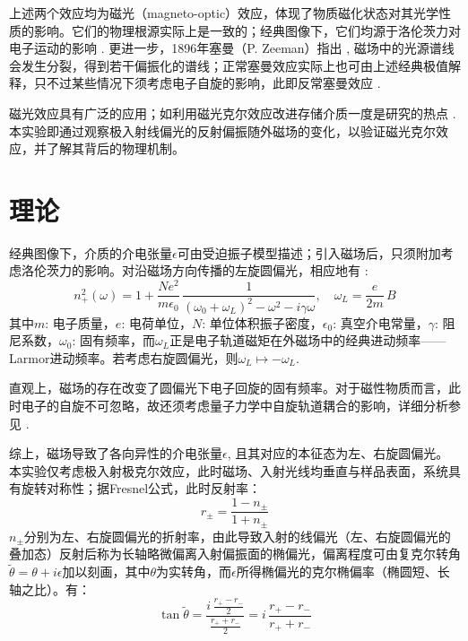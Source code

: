 \documentclass[aps,pre,12pt,preprint,%
	onecolumn,showpacs,showkeys,nofootinbib]{revtex4-1}
\begin{document}
	上述两个效应均为磁光（magneto-optic）效应，体现了物质磁化状态对其光学性质的影响。它们的物理根源实际上是一致的；经典图像下，它们均源于洛伦茨力对电子运动的影响 \cite{textbook}. 更进一步，1896年塞曼（P. Zeeman）指出 \cite{zeeman1896ueber}, 磁场中的光源谱线会发生分裂，得到若干偏振化的谱线；正常塞曼效应实际上也可由上述经典极值解释，只不过某些情况下须考虑电子自旋的影响，此即反常塞曼效应 \cite{sakurai2014modern}. 
	
	磁光效应具有广泛的应用；如利用磁光克尔效应改进存储介质一度是研究的热点 \cite{textbook}. 本实验即通过观察极入射线偏光的反射偏振随外磁场的变化，以验证磁光克尔效应，并了解其背后的物理机制。
\vspace{-.5\baselineskip}
\section{理论}
\vspace{-.5\baselineskip}
	经典图像下，介质的介电张量$\epsilon$可由受迫振子模型描述；引入磁场后，只须附加考虑洛伦茨力的影响。对沿磁场方向传播的左旋圆偏光，相应地有 \cite{textbook}: 
	\begin{equation}
		n^2_+(\omega) = 1 + \frac{Ne^2}{m\epsilon_0}\,
			\frac{1}{
				(\omega_0 + \omega_L)^2 - \omega^2 - i\gamma\omega
			},\quad
		\omega_L = \frac{e}{2m}\,B
	\end{equation}
	其中$m$: 电子质量，$e$: 电荷单位，$N$: 单位体积振子密度，$\epsilon_0$: 真空介电常量，$\gamma$: 阻尼系数，$\omega_0$: 固有频率，而$\omega_L$正是电子轨道磁矩在外磁场中的经典进动频率——Larmor进动频率。若考虑右旋圆偏光，则$\omega_L \mapsto -\omega_L$. 
	
	直观上，磁场的存在改变了圆偏光下电子回旋的固有频率。对于磁性物质而言，此时电子的自旋不可忽略，故还须考虑量子力学中自旋轨道耦合的影响，详细分析参见 \cite{textbook}. 
\clearpage
	
	综上，磁场导致了各向异性的介电张量$\epsilon$, 且其对应的本征态为左、右旋圆偏光。本实验仅考虑极入射极克尔效应，此时磁场、入射光线均垂直与样品表面，系统具有旋转对称性；据Fresnel公式，此时反射率：
	\begin{equation}
		r_\pm = \frac{1 - n_\pm}{1 + n_\pm}
	\end{equation}
	$n_\pm$分别为左、右旋圆偏光的折射率，由此导致入射的线偏光（左、右旋圆偏光的叠加态）反射后称为长轴略微偏离入射偏振面的椭偏光，偏离程度可由复克尔转角$\tilde{\theta} = \theta + i\epsilon$加以刻画，其中$\theta$为实转角，而$\epsilon$所得椭偏光的克尔椭偏率（椭圆短、长轴之比）。有：
	\begin{equation}
		\tan\tilde{\theta}
		= \frac{i\,\frac{r_+ - r_-}{2}}{\frac{r_+ + r_-}{2}}
		= i\,\frac{r_+ - r_-}{r_+ + r_-}
	\end{equation}
	
\end{document}
